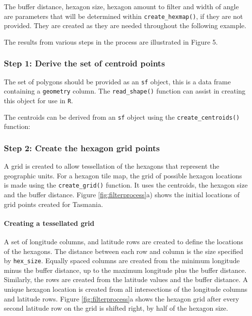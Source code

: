 The buffer distance, hexagon size, hexagon amount to filter and width of
angle are parameters that will be determined within
\texttt{create\_hexmap()}, if they are not provided. They are created as
they are needed throughout the following example.

The results from various steps in the process are illustrated in Figure
5.

\hypertarget{step-1-derive-the-set-of-centroid-points}{%
\subsubsection{Step 1: Derive the set of centroid
points}\label{step-1-derive-the-set-of-centroid-points}}

The set of polygons should be provided as an \texttt{sf} object, this is
a data frame containing a \texttt{geometry} column. The
\texttt{read\_shape()} function can assist in creating this object for
use in \texttt{R}.

The centroids can be derived from an \texttt{sf} object using the
\texttt{create\_centroids()} function:

\hypertarget{step-2-create-the-hexagon-grid-points}{%
\subsubsection{Step 2: Create the hexagon grid
points}\label{step-2-create-the-hexagon-grid-points}}

A grid is created to allow tessellation of the hexagons that represent
the geographic units. For a hexagon tile map, the grid of possible
hexagon locations is made using the \texttt{create\_grid()} function. It
uses the centroids, the hexagon size and the buffer distance. Figure
\ref{fig:filterprocess}a) shows the initial locations of grid points
created for Tasmania.

\hypertarget{creating-a-tessellated-grid}{%
\paragraph{Creating a tessellated
grid}\label{creating-a-tessellated-grid}}

A set of longitude columns, and latitude rows are created to define the
locations of the hexagons. The distance between each row and column is
the size specified by \texttt{hex\_size}. Equally spaced columns are
created from the minimum longitude minus the buffer distance, up to the
maximum longitude plus the buffer distance. Similarly, the rows are
created from the latitude values and the buffer distance. A unique
hexagon location is created from all intersections of the longitude
columns and latitude rows. Figure \ref{fig:filterprocess}a shows the
hexagon grid after every second latitude row on the grid is shifted
right, by half of the hexagon size.

